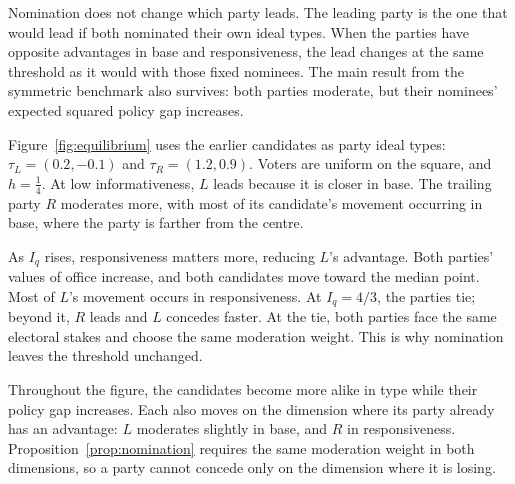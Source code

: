\documentclass[12pt,letterpaper]{article}
\begin{document}
Nomination does not change which party leads. The leading party is the one that would lead if both nominated their own ideal types. When the parties have opposite advantages in base and responsiveness, the lead changes at the same threshold as it would with those fixed nominees. The main result from the symmetric benchmark also survives: both parties moderate, but their nominees' expected squared policy gap increases.

Figure~\ref{fig:equilibrium} uses the earlier candidates as party ideal types: $\tau_L=(0.2,-0.1)$ and $\tau_R=(1.2,0.9)$. Voters are uniform on the square, and $h=\tfrac14$. At low informativeness, $L$ leads because it is closer in base. The trailing party $R$ moderates more, with most of its candidate's movement occurring in base, where the party is farther from the centre.

As $I_q$ rises, responsiveness matters more, reducing $L$'s advantage. Both parties' values of office increase, and both candidates move toward the median point. Most of $L$'s movement occurs in responsiveness. At $I_q=4/3$, the parties tie; beyond it, $R$ leads and $L$ concedes faster. At the tie, both parties face the same electoral stakes and choose the same moderation weight. This is why nomination leaves the threshold unchanged.

Throughout the figure, the candidates become more alike in type while their policy gap increases. Each also moves on the dimension where its party already has an advantage: $L$ moderates slightly in base, and $R$ in responsiveness. Proposition~\ref{prop:nomination} requires the same moderation weight in both dimensions, so a party cannot concede only on the dimension where it is losing.
\end{document}
